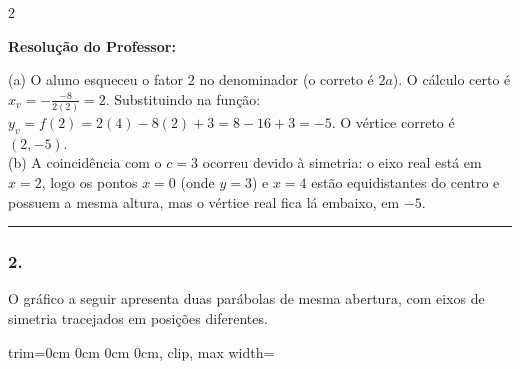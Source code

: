 \begin{multicols*}{2}
\ifgabarito
    \begin{tcolorbox}[colback=CorTitUm!5, colframe=CorTitUm, boxrule=1pt, arc=4pt, left=6pt, right=6pt, top=6pt, bottom=6pt]
    \small\textbf{\textcolor{CorTitUm}{Resolução do Professor:}}\par\vspace{0.1cm}
    \color{CinzaEscuro}
    (a) O aluno esqueceu o fator $2$ no denominador (o correto é $2a$). O cálculo certo é $x_v = -\frac{-8}{2(2)} = 2$. Substituindo na função: $y_v = f(2) = 2(4) - 8(2) + 3 = 8 - 16 + 3 = -5$. O vértice correto é $(2, -5)$. \\
    (b) A coincidência com o $c=3$ ocorreu devido à simetria: o eixo real está em $x=2$, logo os pontos $x=0$ (onde $y=3$) e $x=4$ estão equidistantes do centro e possuem a mesma altura, mas o vértice real fica lá embaixo, em $-5$.
    \end{tcolorbox}
\fi

\par\vspace{\espacoQuestao}

\noindent\textcolor{CorLinha}{\rule{\linewidth}{0.5pt}} 
\par\vspace{\espacoPreQuestao}
\subsubsection*{2.} O gráfico a seguir apresenta duas parábolas de mesma abertura, com eixos de simetria tracejados em posições diferentes.

\begin{center}
\begin{adjustbox}{trim=0cm 0cm 0cm 0cm, clip, max width=\larguraTikz}
\end{adjustbox}
\end{center}
\end{multicols*}
